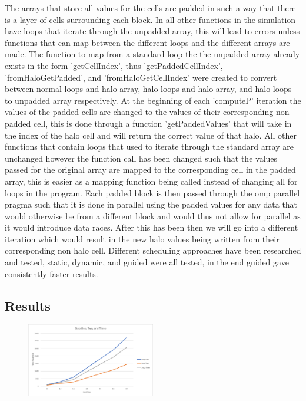 \documentclass[paper=a4, fontsize=11pt]{scrartcl}
\numberwithin{equation}{section}		%
\numberwithin{figure}{section}			%
\numberwithin{table}{section}				%
\begin{document}
The arrays that store all values for the cells are padded in such a way that there is a layer of cells surrounding each block. In all other functions in the simulation have loops that iterate through the unpadded array, this will lead to errors unless functions that can map between the different loops and the different arrays are made. The function to map from a standard loop the the unpadded array already exists in the form 'getCellIndex', thus 'getPaddedCellIndex', 'fromHaloGetPadded', and 'fromHaloGetCellIndex' were created to convert between normal loops and halo array, halo loops and halo array, and halo loops to unpadded array respectively. At the beginning of each 'computeP' iteration the values of the padded cells are changed to the values of their corresponding non padded cell, this is done through a function 'getPaddedValues' that will take in the index of the halo cell and will return the correct value of that halo. All other functions that contain loops that used to iterate through the standard array are unchanged however the function call has been changed such that the values passed for the original array are mapped to the corresponding cell in the padded array, this is easier as a mapping function being called instead of changing all for loops in the program. Each padded block is then passed through the omp parallel pragma such that it is done in parallel using the padded values for any data that would otherwise be from a different block and would thus not allow for parallel as it would introduce data races. After this has been then we will go into a different iteration which would result in the new halo values being written from their corresponding non halo cell. Different scheduling approaches have been researched and tested, static, dynamic, and guided were all tested, in the end guided gave consistently faster results.

\subsection{Results}

\begin{figure}[h]
\centering
\includegraphics[width=0.5\textwidth]{StepThree.png}
\end{figure}
\end{document}
